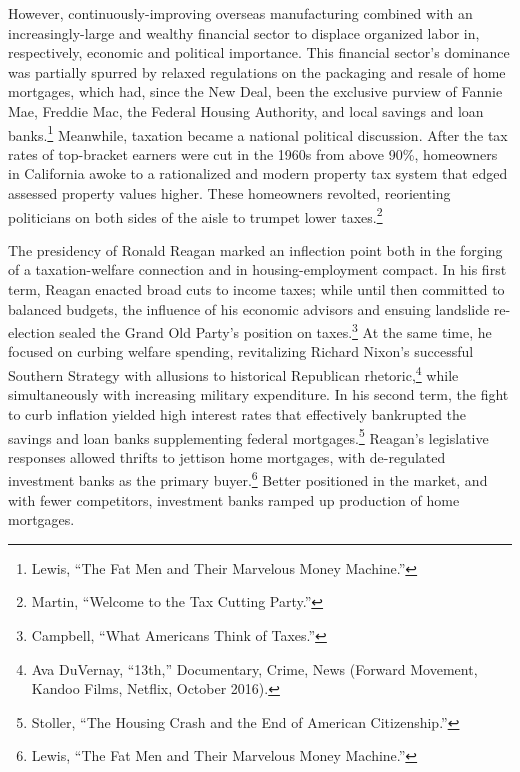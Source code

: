 \documentclass[12pt,oneside]{psthesis}
\begin{document}
However, continuously-improving overseas manufacturing combined with an increasingly-large and wealthy financial sector to displace organized labor in, respectively, economic and political importance.
This financial sector's dominance was partially spurred by relaxed regulations on the packaging and resale of home mortgages, which had, since the New Deal, been the exclusive purview of Fannie Mae, Freddie Mac, the Federal Housing Authority, and local savings and loan banks.\footnote{Lewis, ``The Fat Men and Their Marvelous Money Machine.''}
Meanwhile, taxation became a national political discussion.
After the tax rates of top-bracket earners were cut in the 1960s from above 90\%, homeowners in California awoke to a rationalized and modern property tax system that edged assessed property values higher.
These homeowners revolted, reorienting politicians on both sides of the aisle to trumpet lower taxes.\footnote{Martin, ``Welcome to the Tax Cutting Party.''}

The presidency of Ronald Reagan marked an inflection point both in the forging of a taxation-welfare connection and in housing-employment compact.
In his first term, Reagan enacted broad cuts to income taxes; while until then committed to balanced budgets, the influence of his economic advisors and ensuing landslide re-election sealed the Grand Old Party's position on taxes.\footnote{Campbell, ``What Americans Think of Taxes.''}
At the same time, he focused on curbing welfare spending, revitalizing Richard Nixon's successful Southern Strategy with allusions to historical Republican rhetoric,\footnote{Ava DuVernay, ``13th,'' Documentary, Crime, News (Forward Movement, Kandoo Films, Netflix, October 2016).} while simultaneously with increasing military expenditure.
In his second term, the fight to curb inflation yielded high interest rates that effectively bankrupted the savings and loan banks supplementing federal mortgages.\footnote{Stoller, ``The Housing Crash and the End of American Citizenship.''}
Reagan's legislative responses allowed thrifts to jettison home mortgages, with de-regulated investment banks as the primary buyer.\footnote{Lewis, ``The Fat Men and Their Marvelous Money Machine.''}
Better positioned in the market, and with fewer competitors, investment banks ramped up production of home mortgages.
\end{document}
